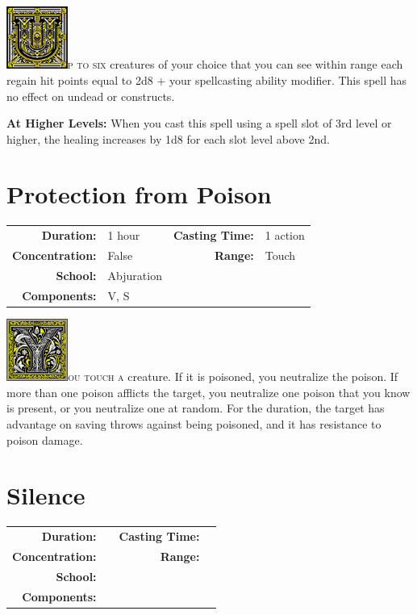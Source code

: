 \documentclass[12pt,showtrims]{memoir}
\begin{document}
\vspace{1\baselineskip}\noindent
\lettrine[lines=4]{\includegraphics[height=58pt]{initials/U.png}}{p to six} creatures of your choice that you can see within range each regain hit points equal to 2d8 + your spellcasting ability modifier. This spell has no effect on undead or constructs.

\vspace{8pt} \noindent\textbf{At Higher Levels:} When you cast this spell using a spell slot of 3rd level or higher, the healing increases by 1d8 for each slot level above 2nd.
\newpage
\section*{Protection from Poison}

{
\small\centering\vspace{-6pt}
\begin{tabular}{rlrl}
\toprule

\textbf{Duration:} & 1 hour &
\textbf{Casting Time:} & 1 action \\
\textbf{Concentration:} & False &
\textbf{Range:} & Touch \\
\textbf{School:} & Abjuration \\
\textbf{Components:} & \multicolumn{3}{p{0.7\textwidth}}{V, S}\\

\bottomrule
\end{tabular}
}

\vspace{1\baselineskip}\noindent 
\lettrine[lines=4]{\includegraphics[height=58pt]{initials/Y.png}}{ou touch a} creature. If it is poisoned, you neutralize the poison. If more than one poison afflicts the target, you neutralize one poison that you know is present, or you neutralize one at random. For the duration, the target has advantage on saving throws against being poisoned, and it has resistance to poison damage.

\newpage
\section*{Silence}
{
\small\centering\vspace{-6pt}
\begin{tabular}{rlrl}
\toprule

\textbf{Duration:} &  &
\textbf{Casting Time:} &  \\
\textbf{Concentration:} & &
\textbf{Range:} &  \\
\textbf{School:} &  \\
\textbf{Components:} & \multicolumn{3}{p{0.7\textwidth}}{}\\

\bottomrule
\end{tabular}
}
\newpage
\end{document}
